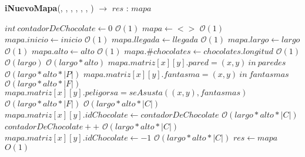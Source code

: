 \documentclass[10pt, a4paper]{article}
\newcommand{\bigO}{\mathcal{O}}
\begin{document}
        \begin{Algoritmos}

        \begin{algorithm}[H]{\textbf{iNuevoMapa}({, , , , , , }) $\to$ $res$ : $mapa$}
            \begin{algorithmic}[1]
                \State $int\ contadorDeChocolate \gets 0$                               \Comment $\bigO(1)$
                \State $mapa \gets <>$                               \Comment $\bigO(1)$
                \State $mapa.inicio  \gets inicio$                           \Comment $\bigO(1)$
                \State $mapa.llegada \gets llegada$           \Comment $\bigO(1)$
                \State $mapa.largo \gets largo$                               \Comment $\bigO(1)$
                \State $mapa.alto  \gets alto$                           \Comment $\bigO(1)$
                \State $mapa.\#chocolates \gets chocolates.longitud$           \Comment $\bigO(1)$
                                    \Comment $\bigO(largo)$
                                        \Comment $\bigO(largo*alto)$
                    \State $mapa.matriz[x][y].pared = (x,y) \ in \ paredes$                                        \Comment $\bigO(largo*alto*|P|)$
                        \State $mapa.matriz[x][y].fantasma = (x,y) \ in \ fantasmas$                                        \Comment $\bigO(largo*alto*|F|)$
                        \State $mapa.matriz[x][y].peligorsa = seAsusta((x,y),fantasmas)$                                        \Comment $\bigO(largo*alto*|F|)$
                                                                               \Comment $\bigO(largo*alto*|C|	)$
                        \State $mapa.matriz[x][y].idChocolate \gets contadorDeChocolate$                    \Comment $\bigO(largo*alto*|C|)$
                        \State $contadorDeChocolate++ $                                     \Comment $\bigO(largo*alto*|C|)$
                        \Else
                        \State $mapa.matriz[x][y].idChocolate \gets -1$                                      \Comment $\bigO(largo*alto*|C|)$
                        \EndIf
                    \EndFor
                \EndFor                                            
                \State $res \gets mapa$                              \Comment $O(1)$
    

\end{algorithmic}
\end{algorithm}
\end{Algoritmos}
\end{document}
